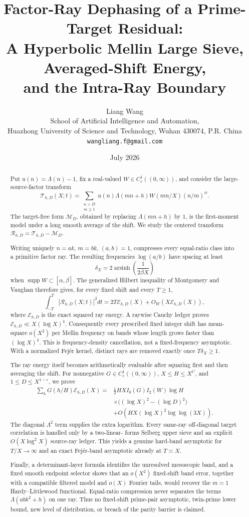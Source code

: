 \documentclass[11pt]{article}
\title{\textbf{Factor-Ray Dephasing of a Prime-Target Residual:}\\
\textbf{A Hyperbolic Mellin Large Sieve, Averaged-Shift Energy,}\\
\textbf{and the Intra-Ray Boundary}}
\author{Liang Wang\\
\small School of Artificial Intelligence and Automation,\\[-0.2em]
\small Huazhong University of Science and Technology, Wuhan 430074, P.R. China\\
\small \texttt{wangliang.f@gmail.com}}
\date{July 2026}
\theoremstyle{definition}
\theoremstyle{remark}
\newcommand{\eps}{\varepsilon}
\newcommand{\cE}{\mathcal E}
\newcommand{\cM}{\mathcal M}
\newcommand{\cR}{\mathcal R}
\newcommand{\cT}{\mathcal T}
\newcommand{\supp}{\operatorname{supp}}
\newcommand{\arsinh}{\operatorname{arsinh}}
\begin{document}
\maketitle

\begin{abstract}
Put $u(n)=\Lambda(n)-1$, fix a real-valued
$W\in C_c^1((0,\infty))$, and consider the large-source-factor transform
\[
 \cT_{h,D}(X;t)=
 \sum_{\substack{n>D\\m\geq1}}
 u(n)\Lambda(mn+h)W(mn/X)(n/m)^{it}.
\]
The target-free form $\cM_D$, obtained by replacing $\Lambda(mn+h)$ by
$1$, is the first-moment model under a long smooth average of the shift.
We study the centered transform $\cR_{h,D}=\cT_{h,D}-\cM_D$.

Writing uniquely $n=ak$, $m=bk$, $(a,b)=1$, compresses every equal-ratio
class into a primitive factor ray.  The resulting frequencies
$\log(a/b)$ have spacing at least
\[
 \delta_X=2\arsinh\!\left(\frac{1}{2\beta X}\right)
\]
when $\supp W\subset[\alpha,\beta]$.  The generalized Hilbert inequality
of Montgomery and Vaughan therefore gives, for every fixed shift and every
$T\geq1$,
\[
 \int_{-T}^{T}|\cR_{h,D}(X;t)|^2dt
 =2T\cE_{h,D}(X)+O_W(X\cE_{h,D}(X)),
\]
where $\cE_{h,D}$ is the exact squared ray energy.  A raywise Cauchy
ledger proves $\cE_{h,D}\ll X(\log X)^4$.  Consequently every prescribed
fixed integer shift has mean-square $o(X^2)$ per Mellin
frequency on bands whose length grows faster than $(\log X)^4$.  This is
frequency-density cancellation, not a fixed-frequency asymptotic.
With a normalized Fej\'er kernel, distinct rays are removed exactly once
$T\delta_X\geq1$.

The ray energy itself becomes arithmetically evaluable after squaring first
and then averaging the shift.  For nonnegative
$G\in C_c^1((0,\infty))$, $X\leq H\leq X^C$, and
$1\leq D\leq X^{1-\eps}$, we prove
\begin{align*}
 \sum_hG(h/H)\cE_{h,D}(X)
 ={}&\frac12HX I_0(G)I_2(W)\log H\\
 &\times\bigl((\log X)^2-(\log D)^2\bigr)\\
 &+O\!\left(HX(\log X)^2\log\log(3X)\right).
\end{align*}
The diagonal $\Lambda^2$ term supplies the extra logarithm.  Every
same-ray off-diagonal target correlation is handled only by a two-linear-
forms Selberg upper sieve and an explicit $O(X\log^2X)$ source-ray ledger.
This yields a genuine hard-band asymptotic for $T/X\to\infty$ and an exact
Fej\'er-band asymptotic already at $T\asymp X$.

Finally, a determinant-layer formula identifies the unresolved
mesoscopic band, and a fixed smooth endpoint selector shows that an
$o(X^2)$ fixed-shift band error, together with a compatible filtered model
and $o(X)$ Fourier tails, would recover the $m=1$ Hardy--Littlewood
functional.  Equal-ratio compression never
separates the terms $\Lambda(abk^2+h)$ on one ray.  Thus no fixed-shift
prime-pair asymptotic, twin-prime lower bound, new level of distribution,
or breach of the parity barrier is claimed.
\end{abstract}
\end{document}
